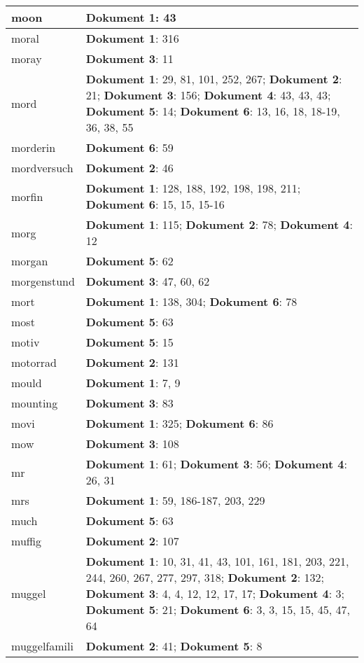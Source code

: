 \documentclass[a5paper]{article}
\begin{document}
\begin{longtable}[l]{|l|p{3in}|}
\hline
moon & \textbf{Dokument 1}: 43 \\
\hline
moral & \textbf{Dokument 1}: 316 \\
\hline
moray & \textbf{Dokument 3}: 11 \\
\hline
mord & \textbf{Dokument 1}: 29, 81, 101, 252, 267; \textbf{Dokument 2}: 21; \textbf{Dokument 3}: 156; \textbf{Dokument 4}: 43, 43, 43; \textbf{Dokument 5}: 14; \textbf{Dokument 6}: 13, 16, 18, 18-19, 36, 38, 55 \\
\hline
morderin & \textbf{Dokument 6}: 59 \\
\hline
mordversuch & \textbf{Dokument 2}: 46 \\
\hline
morfin & \textbf{Dokument 1}: 128, 188, 192, 198, 198, 211; \textbf{Dokument 6}: 15, 15, 15-16 \\
\hline
morg & \textbf{Dokument 1}: 115; \textbf{Dokument 2}: 78; \textbf{Dokument 4}: 12 \\
\hline
morgan & \textbf{Dokument 5}: 62 \\
\hline
morgenstund & \textbf{Dokument 3}: 47, 60, 62 \\
\hline
mort & \textbf{Dokument 1}: 138, 304; \textbf{Dokument 6}: 78 \\
\hline
most & \textbf{Dokument 5}: 63 \\
\hline
motiv & \textbf{Dokument 5}: 15 \\
\hline
motorrad & \textbf{Dokument 2}: 131 \\
\hline
mould & \textbf{Dokument 1}: 7, 9 \\
\hline
mounting & \textbf{Dokument 3}: 83 \\
\hline
movi & \textbf{Dokument 1}: 325; \textbf{Dokument 6}: 86 \\
\hline
mow & \textbf{Dokument 3}: 108 \\
\hline
mr & \textbf{Dokument 1}: 61; \textbf{Dokument 3}: 56; \textbf{Dokument 4}: 26, 31 \\
\hline
mrs & \textbf{Dokument 1}: 59, 186-187, 203, 229 \\
\hline
much & \textbf{Dokument 5}: 63 \\
\hline
muffig & \textbf{Dokument 2}: 107 \\
\hline
muggel & \textbf{Dokument 1}: 10, 31, 41, 43, 101, 161, 181, 203, 221, 244, 260, 267, 277, 297, 318; \textbf{Dokument 2}: 132; \textbf{Dokument 3}: 4, 4, 12, 12, 17, 17; \textbf{Dokument 4}: 3; \textbf{Dokument 5}: 21; \textbf{Dokument 6}: 3, 3, 15, 15, 45, 47, 64 \\
\hline
muggelfamili & \textbf{Dokument 2}: 41; \textbf{Dokument 5}: 8 \\

\end{longtable}
\end{document}
